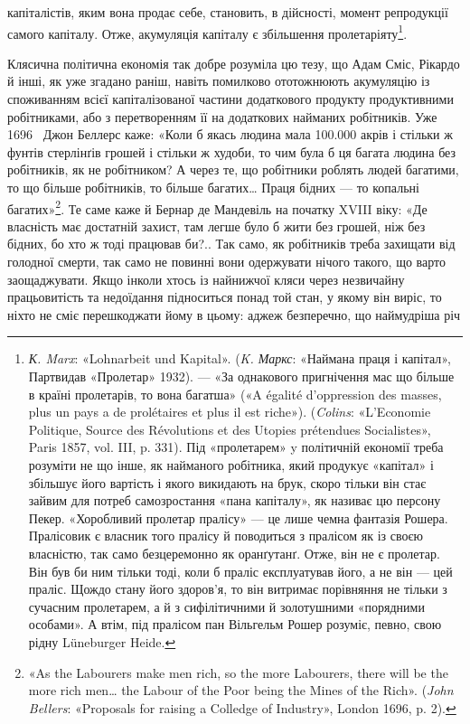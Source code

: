 капіталістів, яким вона продає себе, становить, в дійсності,
момент репродукції самого капіталу. Отже, акумуляція
капіталу є збільшення пролетаріяту\footnote{
\emph{К. Marx}: «Lohnarbeit und Kapital». (\emph{K. Маркс}: «Наймана праця
і капітал», Партвидав «Пролетар» 1932). — «За однакового пригнічення
мас що більше в країні пролетарів, то вона багатша» («A égalité
d’oppression des masses, plus un pays a de prolétaires et plus il est riche»).
(\emph{Colins}: «L’Economie Politique, Source des Révolutions et des Utopies
prétendues Socialistes», Paris 1857, vol. III, p. 331). Під «пролетарем»
y політичній економії треба розуміти не що інше, як найманого робітника,
який продукує «капітал» і збільшує його вартість і якого викидають
на брук, скоро тільки він стає зайвим для потреб самозростання
«пана капіталу», як називає цю персону Пекер. «Хоробливий пролетар
пралісу» — це лише чемна фантазія Рошера. Пралісовик є власник того
пралісу й поводиться з пралісом як із своєю власністю, так само безцеремонно
як оранґутанґ. Отже, він не є пролетар. Він був би ним тільки
тоді, коли б праліс експлуатував його, а не він — цей праліс. Щождо
стану його здоров'я, то він витримає порівняння не тільки з сучасним
пролетарем, а й з сифілітичними й золотушними «порядними особами».
А втім, під пралісом пан Вільгельм Рошер розуміє, певно, свою рідну
Lüneburger Heide.
}.

Клясична політична економія так добре розуміла цю тезу,
що Адам Сміс, Рікардо й інші, як уже згадано раніш, навіть помилково
ототожнюють акумуляцію із споживанням всієї капіталізованої
частини додаткового продукту продуктивними робітниками,
або з перетворенням її на додаткових найманих робітників.
Уже 1696~ Джон Беллерс каже: «Коли б якась людина
мала \num{100.000} акрів і стільки ж фунтів стерлінґів грошей і стільки
ж худоби, то чим була б ця багата людина без робітників, як не
робітником? А через те, що робітники роблять людей багатими,
то що більше робітників, то більше багатих\dots{} Праця бідних — то
копальні багатих»\footnote{
«As the Labourers make men rich, so the more Labourers, there
will be the more rich men\dots{} the Labour of the Poor being the Mines of the
Rich». (\emph{John Bellers}: «Proposals for raising a Colledge of Industry»,
London 1696, p. 2).
}. Те саме каже й Бернар де Мандевіль
на початку XVIII віку: «Де власність має достатній захист, там
легше було б жити без грошей, ніж без бідних, бо хто ж тоді
працював би?.. Так само, як робітників треба захищати від голодної
смерти, так само не повинні вони одержувати нічого
такого, що варто заощаджувати. Якщо інколи хтось із найнижчої
кляси через незвичайну працьовитість та недоїдання підноситься
понад той стан, у якому він виріс, то ніхто не сміє перешкоджати
йому в цьому: аджеж безперечно, що наймудріша річ
\parbreak{}  %

